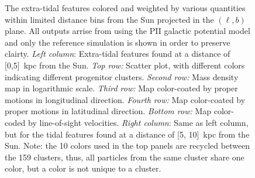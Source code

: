 \begin{figure}[h!]
        \caption[The extra-tidal features colored and weighted by various quantities within limited distance bins from the Sun projected in the $(\ell, b)$ plane.]{{\tiny The extra-tidal features colored and weighted by various quantities within limited distance bins from the Sun projected in the $(\ell, b)$ plane. All outputs arrise from using the PII galactic potential model and only the reference simulation is shown in order to preserve clairty. \emph{Left column}: Extra-tidal features found at a distance of [0,5]~kpc from the Sun. \emph{Top row:} Scatter plot, with different colors indicating different progenitor clusters. \emph{Second row:} Mass density map in logarithmic scale. \emph{Third row:} Map color-coated by proper motions in longitudinal direction.    \emph{Fourth row:} Map color-coated by proper motions in latitudinal direction.  \emph{Bottom row:} Map color-coded by line-of-sight velocities. \emph{Right column}: Same as left column, but for the tidal features found at a distance of [5, 10]~kpc from the Sun. Note: the 10 colors used in the top panels are recycled between the 159 clusters, thus, all particles from the same cluster share one color, but a color is not unique to a cluster.} }\label{D0-10}
    \end{figure}
    \onecolumn

